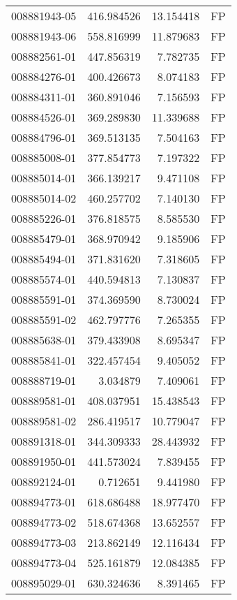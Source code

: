\begin{tabular}{lrrl}
008881943-05 &  416.984526 &    13.154418 &   FP \\
008881943-06 &  558.816999 &    11.879683 &   FP \\
008882561-01 &  447.856319 &     7.782735 &   FP \\
008884276-01 &  400.426673 &     8.074183 &   FP \\
008884311-01 &  360.891046 &     7.156593 &   FP \\
008884526-01 &  369.289830 &    11.339688 &   FP \\
008884796-01 &  369.513135 &     7.504163 &   FP \\
008885008-01 &  377.854773 &     7.197322 &   FP \\
008885014-01 &  366.139217 &     9.471108 &   FP \\
008885014-02 &  460.257702 &     7.140130 &   FP \\
008885226-01 &  376.818575 &     8.585530 &   FP \\
008885479-01 &  368.970942 &     9.185906 &   FP \\
008885494-01 &  371.831620 &     7.318605 &   FP \\
008885574-01 &  440.594813 &     7.130837 &   FP \\
008885591-01 &  374.369590 &     8.730024 &   FP \\
008885591-02 &  462.797776 &     7.265355 &   FP \\
008885638-01 &  379.433908 &     8.695347 &   FP \\
008885841-01 &  322.457454 &     9.405052 &   FP \\
008888719-01 &    3.034879 &     7.409061 &   FP \\
008889581-01 &  408.037951 &    15.438543 &   FP \\
008889581-02 &  286.419517 &    10.779047 &   FP \\
008891318-01 &  344.309333 &    28.443932 &   FP \\
008891950-01 &  441.573024 &     7.839455 &   FP \\
008892124-01 &    0.712651 &     9.441980 &   FP \\
008894773-01 &  618.686488 &    18.977470 &   FP \\
008894773-02 &  518.674368 &    13.652557 &   FP \\
008894773-03 &  213.862149 &    12.116434 &   FP \\
008894773-04 &  525.161879 &    12.084385 &   FP \\
008895029-01 &  630.324636 &     8.391465 &   FP \\

\end{tabular}
